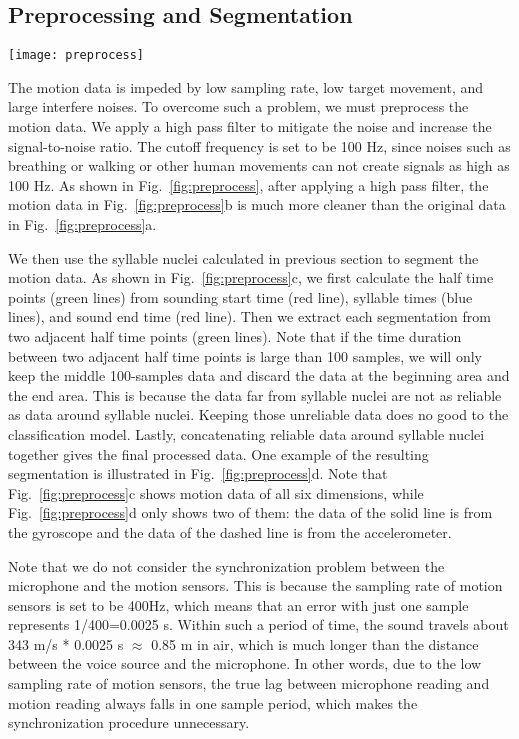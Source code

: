 %
\subsection{Preprocessing and Segmentation}
\begin{figure*}[h]
	\centering
	\texttt{[image: preprocess]}
	\caption{Preprocessing and Segmentation. }
	\label{fig:preprocess}
\end{figure*}
The motion data is impeded by low sampling rate, low target movement, and large interfere noises. To overcome such a problem, we must preprocess the motion data. We apply a high pass filter to mitigate the noise and increase the signal-to-noise ratio. The cutoff frequency is set to be 100 Hz, since noises such as breathing or walking or other human movements can not create signals as high as 100 Hz. As shown in Fig.~\ref{fig:preprocess}, after applying a high pass filter, the motion data in Fig.~\ref{fig:preprocess}b is much more cleaner than the original data in Fig.~\ref{fig:preprocess}a. 

We then use the syllable nuclei calculated in previous section to segment the motion data. As shown in Fig.~\ref{fig:preprocess}c, we first calculate the half time points (green lines) from sounding start time (red line), syllable times (blue lines), and sound end time (red line). Then we extract each segmentation from two adjacent half time points (green lines). Note that if the time duration between two adjacent half time points is large than 100 samples,  we will only keep the middle 100-samples data and discard the data at the beginning area and the end area. This is because the data far from syllable nuclei are not as reliable as data around syllable nuclei. Keeping those unreliable data does no good to the classification model.
%
Lastly, concatenating reliable data around syllable nuclei together gives the final processed data. One example of the resulting segmentation is illustrated in Fig.~\ref{fig:preprocess}d. Note that Fig.~\ref{fig:preprocess}c shows motion data of all six dimensions, while Fig.~\ref{fig:preprocess}d only shows two of them: the data of the solid line is  from the gyroscope and the data of the dashed line is from the accelerometer.

Note that we do not consider the synchronization problem between the microphone and the motion sensors. This is because the sampling rate of motion sensors is set to be 400Hz, which means that an error with just one sample represents 1/400=0.0025 s. Within such a period of time, the sound travels about 343 m/s * 0.0025 s $\approx$ 0.85 m  in air, which is much longer than the distance between the voice source and the microphone. In other words, due to the low sampling rate of motion sensors, the true lag between microphone reading and motion reading always falls in one sample period, which makes the synchronization procedure unnecessary. 

